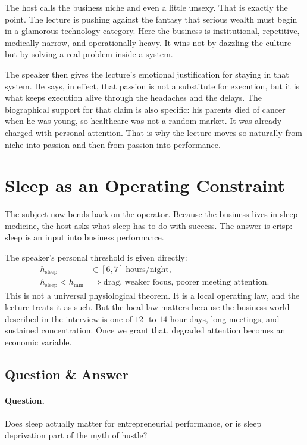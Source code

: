 The host calls the business niche and even a little unsexy. That is exactly the point. The lecture is pushing against the fantasy that serious wealth must begin in a glamorous technology category. Here the business is institutional, repetitive, medically narrow, and operationally heavy. It wins not by dazzling the culture but by solving a real problem inside a system.

The speaker then gives the lecture’s emotional justification for staying in that system. He says, in effect, that passion is not a substitute for execution, but it is what keeps execution alive through the headaches and the delays. The biographical support for that claim is also specific: his parents died of cancer when he was young, so healthcare was not a random market. It was already charged with personal attention. That is why the lecture moves so naturally from niche into passion and then from passion into performance.

\section{Sleep as an Operating Constraint}

The subject now bends back on the operator. Because the business lives in sleep medicine, the host asks what sleep has to do with success. The answer is crisp: sleep is an input into business performance.

The speaker’s personal threshold is given directly:
\begin{align}
h_{\text{sleep}} &\in [6,7]\ \text{hours/night}, \\
h_{\text{sleep}} < h_{\min} &\Rightarrow \text{drag, weaker focus, poorer meeting attention}.
\end{align}
This is not a universal physiological theorem. It is a local operating law, and the lecture treats it as such. But the local law matters because the business world described in the interview is one of \(12\)- to \(14\)-hour days, long meetings, and sustained concentration. Once we grant that, degraded attention becomes an economic variable.

\subsection{Question \& Answer}

\paragraph{Question.} Does sleep actually matter for entrepreneurial performance, or is sleep deprivation part of the myth of hustle?

